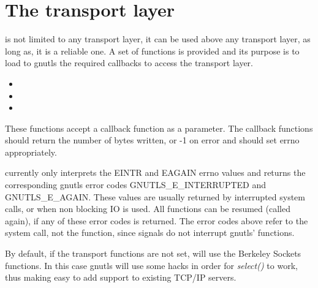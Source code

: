 \section{The transport layer}
\par
\tls{} is not limited to any transport layer, it 
can be used above any transport layer, as long as, it is a reliable 
one. A set of functions is provided and its purpose is to load
to gnutls the required callbacks to access the transport layer.

\begin{itemize}
\item {}
\item {}
\item {}
\end{itemize}

These functions accept a callback function as a parameter.
The callback functions should return the number of bytes written, or -1 on 
error and should set errno appropriately.
\par
\gnutls{} currently only interprets the EINTR and EAGAIN errno values and
returns the corresponding gnutls error codes GNUTLS\_E\_INTERRUPTED and
GNUTLS\_E\_AGAIN.
These values are usually returned by interrupted system calls, or 
when non blocking IO is used. All \gnutls{} functions
can be resumed (called again), if any of these error codes is returned.
The error codes above refer to the system call, not the \gnutls{} function,
since signals do not interrupt gnutls' functions.

\par
By default, if the transport functions are not set, \gnutls{} will use
the Berkeley Sockets functions. In this case
gnutls will use some hacks in order for \emph{select()} to work, thus
making easy to add \tls{} support to existing TCP/IP servers.
